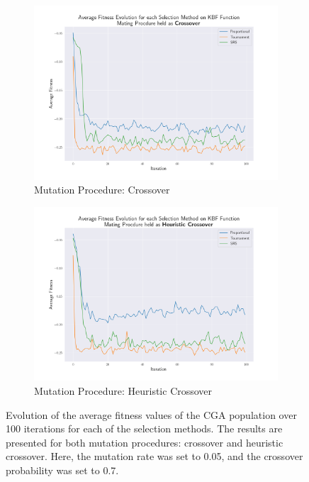 \documentclass[10pt]{article}
\begin{document}
\begin{multicols}{2}
\begin{figure}[H]
    \centering
    \begin{subfigure}{0.44\textwidth}
        \includegraphics[width=\textwidth]{../figures/Permanent Images/Fitness_Evolution_Crossover.png}
        \caption{Mutation Procedure: Crossover}
    \end{subfigure}
    \begin{subfigure}{0.44\textwidth}
        \includegraphics[width=\textwidth]{../figures/Permanent Images/Fitness_Evolution_Heuristic Crossover.png}
        \caption{Mutation Procedure: Heuristic Crossover}
    \end{subfigure}
    \captionsetup{justification=centering}
    \caption{Evolution of the average fitness values of the CGA population over 100 iterations for each of the selection methods. The results are presented for both mutation procedures: crossover and heuristic crossover. Here, the mutation rate was set to 0.05, and the crossover probability was set to 0.7.}
    \label{fig:CGA_fitness_evo}
\end{figure}


\end{multicols}
\end{document}
